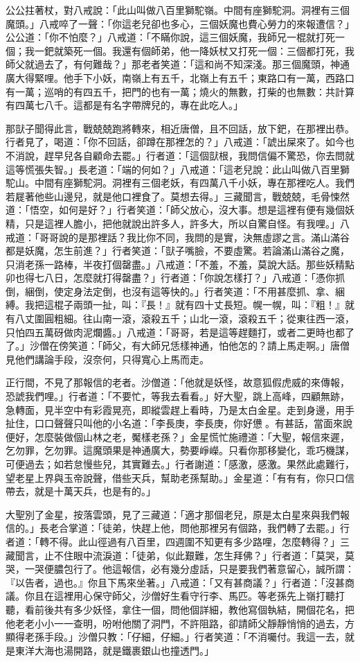 公公拄著杖，對八戒說：「此山叫做八百里獅駝嶺。中間有座獅駝洞。洞裡有三個魔頭。」八戒啐了一聲：「你這老兒卻也多心，三個妖魔也費心勞力的來報遭信？」公公道：「你不怕麼？」八戒道：「不瞞你說，這三個妖魔，我師兄一棍就打死一個；我一鈀就築死一個。我還有個師弟，他一降妖杖又打死一個：三個都打死，我師父就過去了，有何難哉？」那老者笑道：「這和尚不知深淺。那三個魔頭，神通廣大得緊哩。他手下小妖，南嶺上有五千，北嶺上有五千；東路口有一萬，西路口有一萬；巡哨的有四五千，把門的也有一萬；燒火的無數，打柴的也無數：共計算有四萬七八千。這都是有名字帶牌兒的，專在此吃人。」

那獃子聞得此言，戰兢兢跑將轉來，相近唐僧，且不回話，放下鈀，在那裡出恭。行者見了，喝道：「你不回話，卻蹲在那裡怎的？」八戒道：「諕出屎來了。如今也不消說，趕早兒各自顧命去罷。」行者道：「這個獃根，我問信偏不驚恐，你去問就這等慌張失智。」長老道：「端的何如？」八戒道：「這老兒說：此山叫做八百里獅駝山。中間有座獅駝洞。洞裡有三個老妖，有四萬八千小妖，專在那裡吃人。我們若屣著他些山邊兒，就是他口裡食了。莫想去得。」三藏聞言，戰兢兢，毛骨悚然道：「悟空，如何是好？」行者笑道：「師父放心，沒大事。想是這裡有便有幾個妖精，只是這裡人膽小，把他就說出許多人，許多大，所以自驚自怪。有我哩。」八戒道：「哥哥說的是那裡話？我比你不同，我問的是實，決無虛謬之言。滿山滿谷都是妖魔，怎生前進？」行者笑道：「獃子嘴臉，不要虛驚。若論滿山滿谷之魔，只消老孫一路棒，半夜打個罄盡。」八戒道：「不羞，不羞，莫說大話。那些妖精點卯也得七八日，怎麼就打得罄盡？」行者道：「你說怎樣打？」八戒道：「憑你抓倒，綑倒，使定身法定倒，也沒有這等快的。」行者笑道：「不用甚麼抓、拿、綑縛。我把這棍子兩頭一扯，叫：『長！』就有四十丈長短。幌一幌，叫：『粗！』就有八丈圍圓粗細。往山南一滾，滾殺五千；山北一滾，滾殺五千；從東往西一滾，只怕四五萬砑做肉泥爛醬。」八戒道：「哥哥，若是這等趕麵打，或者二更時也都了了。」沙僧在傍笑道：「師父，有大師兄恁樣神通，怕他怎的？請上馬走啊。」唐僧見他們講論手段，沒奈何，只得寬心上馬而走。

正行間，不見了那報信的老者。沙僧道：「他就是妖怪，故意狐假虎威的來傳報，恐諕我們哩。」行者道：「不要忙，等我去看看。」好大聖，跳上高峰，四顧無跡，急轉面，見半空中有彩霞晃亮，即縱雲趕上看時，乃是太白金星。走到身邊，用手扯住，口口聲聲只叫他的小名道：「李長庚，李長庚，你好憊𪬯。有甚話，當面來說便好，怎麼裝做個山林之老，魘樣老孫？」金星慌忙施禮道：「大聖，報信來遲，乞勿罪，乞勿罪。這魔頭果是神通廣大，勢要崢嶸。只看你那移變化，乖巧機謀，可便過去；如若怠慢些兒，其實難去。」行者謝道：「感激，感激。果然此處難行，望老星上界與玉帝說聲，借些天兵，幫助老孫幫助。」金星道：「有有有，你只口信帶去，就是十萬天兵，也是有的。」

大聖別了金星，按落雲頭，見了三藏道：「適才那個老兒，原是太白星來與我們報信的。」長老合掌道：「徒弟，快趕上他，問他那裡另有個路，我們轉了去罷。」行者道：「轉不得。此山徑過有八百里，四週圍不知更有多少路哩，怎麼轉得？」三藏聞言，止不住眼中流淚道：「徒弟，似此艱難，怎生拜佛？」行者道：「莫哭，莫哭，一哭便膿包行了。他這報信，必有幾分虛話，只是要我們著意留心，誠所謂：『以告者，過也。』你且下馬來坐著。」八戒道：「又有甚商議？」行者道：「沒甚商議。你且在這裡用心保守師父，沙僧好生看守行李、馬匹。等老孫先上嶺打聽打聽，看前後共有多少妖怪，拿住一個，問他個詳細，教他寫個執結，開個花名，把他老老小小一一查明，吩咐他關了洞門，不許阻路，卻請師父靜靜悄悄的過去，方顯得老孫手段。」沙僧只教：「仔細，仔細。」行者笑道：「不消囑付。我這一去，就是東洋大海也湯開路，就是鐵裹銀山也撞透門。」

